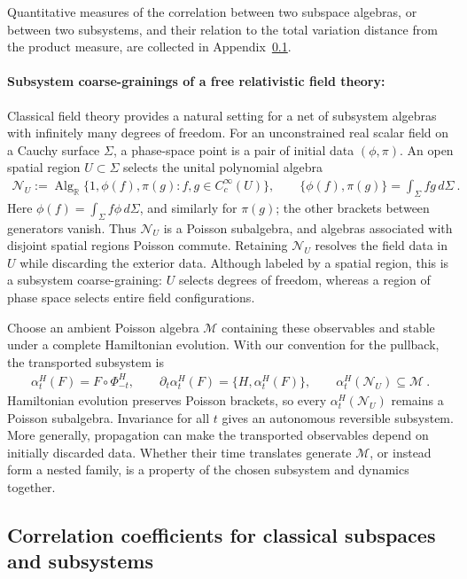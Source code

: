 \documentclass[a4paper,11pt]{article}
\theoremstyle{definition}
\newcommand{\mN}{\mathcal{N}}
\newcommand{\mM}{\mathcal{M}}
\begin{document}
Quantitative measures of the correlation between two subspace algebras, or between two subsystems, and their relation to the total variation distance from the product measure, are collected in Appendix~\ref{app:classical-correlations}.

\paragraph{Subsystem coarse-grainings of a free relativistic field theory:} Classical field theory provides a natural setting for a net of subsystem algebras with infinitely many degrees of freedom. For an unconstrained real scalar field on a Cauchy surface $\Sigma$, a phase-space point is a pair of initial data $(\phi,\pi)$. An open spatial region $U\subset\Sigma$ selects the unital polynomial algebra
\begin{align}
    \mN_U
    :=\operatorname{Alg}_{\mathbb R}\{1,\phi(f),\pi(g):f,g\in C_c^\infty(U)\},
    \qquad
    \{\phi(f),\pi(g)\}=\int_\Sigma fg\,d\Sigma\ .
\end{align}
Here $\phi(f)=\int_\Sigma f\phi\,d\Sigma$, and similarly for $\pi(g)$; the other brackets between generators vanish. Thus $\mN_U$ is a Poisson subalgebra, and algebras associated with disjoint spatial regions Poisson commute. Retaining $\mN_U$ resolves the field data in $U$ while discarding the exterior data. Although labeled by a spatial region, this is a subsystem coarse-graining: $U$ selects degrees of freedom, whereas a region of phase space selects entire field configurations.


Choose an ambient Poisson algebra $\mM$ containing these observables and stable under a complete Hamiltonian evolution. With our convention for the pullback, the transported subsystem is
\begin{align}
    \alpha_t^H(F)=F\circ\Phi_{-t}^H,
    \qquad \partial_t\alpha_t^H(F)=\{H,\alpha_t^H(F)\},
    \qquad \alpha_t^H(\mN_U)\subseteq\mM\ .
\end{align}
Hamiltonian evolution preserves Poisson brackets, so every $\alpha_t^H(\mN_U)$ remains a Poisson subalgebra. Invariance for all $t$ gives an autonomous reversible subsystem. More generally, propagation can make the transported observables depend on initially discarded data. Whether their time translates generate $\mM$, or instead form a nested family, is a property of the chosen subsystem and dynamics together.


\subsection{Correlation coefficients for classical subspaces and subsystems}\label{app:classical-correlations}
\end{document}
